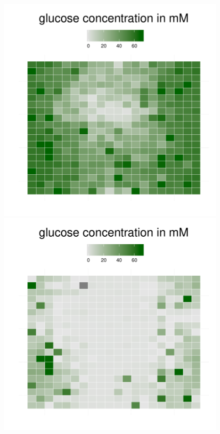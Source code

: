 \begin{figure}[h!]
{\begin{minipage}[t]{0.3\textwidth}
  \end{minipage}
  \begin{minipage}[t]{0.3\textwidth}
    \includegraphics[width=\textwidth]{../results/ecoli_beijerinckii_20x20_seed5147_glc45.pdf}
  \end{minipage}
  \begin{minipage}[t]{0.3\textwidth}
    \includegraphics[width=\textwidth]{../results/ecoli_beijerinckii_20x20_seed5147_glc60.pdf}

\end{minipage}}
\end{figure}

